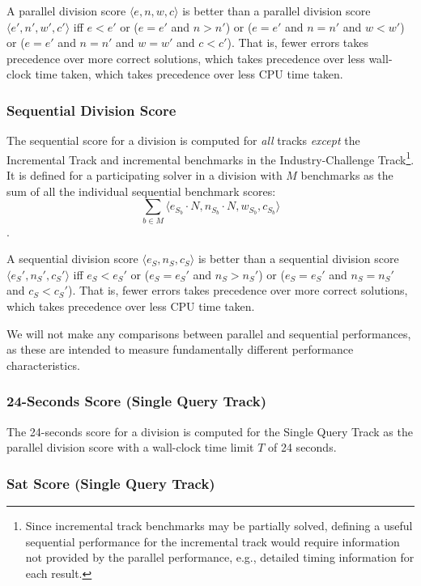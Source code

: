 \documentclass[12pt]{article}
\newcommand{\maintrack}{Single Query Track\xspace}
\newcommand{\inctrack}{Incremental Track\xspace}
\newcommand{\challtrack}{Industry-Challenge Track\xspace}
\begin{document}
\noindent
A parallel division score $\langle e, n, w, c\rangle$ is better than a parallel
division score $\langle e', n', w', c'\rangle$ iff $e < e'$ or ($e = e'$ and $n
> n'$) or ($e = e'$ and $n = n'$ and $w < w'$) or ($e = e'$ and $n = n'$ and $w
= w'$ and $c < c'$).  That is, fewer errors takes precedence over more correct
solutions, which takes precedence over less wall-clock time taken, which takes
precedence over less CPU time taken.

\subsubsection{Sequential Division Score}

The sequential score for a division is computed for \emph{all} tracks
\emph{except} the \inctrack and incremental benchmarks in the
\challtrack\footnote{Since incremental track benchmarks may be partially
solved, defining a useful sequential performance for the incremental track
would require information not provided by the parallel performance, e.g.,
detailed timing information for each result.}.  It is defined for a
participating solver in a division with $M$ benchmarks as the sum of all the
individual sequential benchmark scores:
$$\sum_{b\in M} \langle e_{S_b} \cdot N, n_{S_b} \cdot N, w_{S_b}, c_{S_b}\rangle$$.

\noindent
A sequential division score $\langle e_S, n_S, c_S\rangle$ is better than a
sequential division score $\langle e_S', n_S', c_S'\rangle$ iff $e_S < e_S'$ or
($e_S = e_S'$ and $n_S > n_S'$) or ($e_S = e_S'$ and $n_S = n_S'$ and $c_S <
c_S'$).  That is, fewer errors takes precedence over more correct solutions,
which takes precedence over less CPU time taken.

We will not make any comparisons between parallel and sequential performances,
as these are intended to measure fundamentally different performance
characteristics.

\subsubsection{24-Seconds Score (\maintrack)}

The 24-seconds score for a division is computed for the \maintrack as the
parallel division score with a wall-clock time limit $T$ of 24 seconds.

\subsubsection{Sat Score (\maintrack)}
\end{document}
